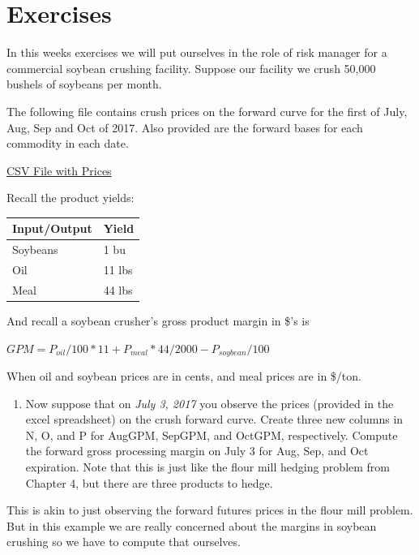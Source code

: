 \documentclass[
  letterpaper,
  DIV=11,
  numbers=noendperiod]{scrreprt}
\providecommand{\tightlist}{%
  \setlength{\itemsep}{0pt}\setlength{\parskip}{0pt}}\usepackage{longtable,booktabs,array}
\begin{document}
\hypertarget{exercises-5}{%
\section{Exercises}\label{exercises-5}}

In this weeks exercises we will put ourselves in the role of risk
manager for a commercial soybean crushing facility. Suppose our facility
we crush 50,000 bushels of soybeans per month.

The following file contains crush prices on the forward curve for the
first of July, Aug, Sep and Oct of 2017. Also provided are the forward
bases for each commodity in each date.

\href{Excel-files/soy-crush-exercise.csv}{CSV File with Prices}

Recall the product yields:

\begin{longtable}[]{@{}ll@{}}
\toprule\noalign{}
Input/Output & Yield \\
\midrule\noalign{}
\endhead
\bottomrule\noalign{}
\endlastfoot
Soybeans & 1 bu \\
Oil & 11 lbs \\
Meal & 44 lbs \\
\end{longtable}

And recall a soybean crusher's gross product margin in \$'s is

\(GPM = P_{oil}/100*11 + P_{meal}*44/2000 - P_{soybean}/100\)

When oil and soybean prices are in cents, and meal prices are in \$/ton.

\begin{enumerate}
\def\labelenumi{\arabic{enumi}.}
\tightlist
\item
  Now suppose that on \emph{July 3, 2017} you observe the prices
  (provided in the excel spreadsheet) on the crush forward curve. Create
  three new columns in N, O, and P for AugGPM, SepGPM, and OctGPM,
  respectively. Compute the forward gross processing margin on July 3
  for Aug, Sep, and Oct expiration. Note that this is just like the
  flour mill hedging problem from Chapter 4, but there are three
  products to hedge.
\end{enumerate}

This is akin to just observing the forward futures prices in the flour
mill problem. But in this example we are really concerned about the
margins in soybean crushing so we have to compute that ourselves.
\end{document}
